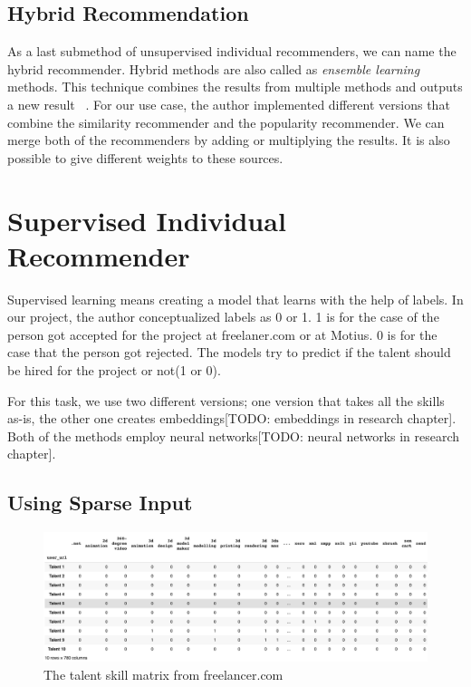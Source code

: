 \subsection{Hybrid Recommendation}

As a last submethod of unsupervised individual recommenders, we can name the hybrid recommender. Hybrid methods are also called as \textit{ensemble learning} methods. This technique combines the results from multiple methods and outputs a new result ~\parencite{beliakov2015aggregation}. For our use case, the author implemented different versions that combine the similarity recommender and the popularity  recommender. We can merge both of the recommenders by adding or multiplying the results. It is also possible to give different weights to these sources.


\section{Supervised Individual Recommender}\label{section:supervised}

Supervised learning means creating a model that learns with the help of labels. In our project, the author conceptualized labels as 0 or 1. 1 is for the case of the person got accepted for the project at freelaner.com or at Motius. 0 is for the case that the person got rejected. The models try to predict if the talent should be hired for the project or not(1 or 0).

For this task, we use two different versions; one version that takes all the skills as-is, the other one creates embeddings[TODO: embeddings in research chapter]. Both of the methods employ neural networks[TODO: neural networks in research chapter].


\subsection{Using Sparse Input}

\begin{figure}[!ht]
	\centering
	\includegraphics[width=\textwidth]{figures/FreelancerTalentSkillsMatrix.png}
	\caption{The talent skill matrix from freelancer.com}
	\label{fig:freelancer-talent-matrix}
\end{figure}


